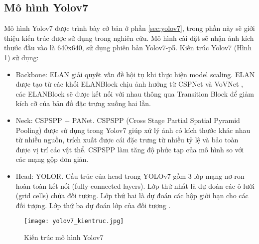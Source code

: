 \documentclass[../the.tex]{subfiles}
\begin{document}
\subsection{Mô hình Yolov7}
{\fontsize{13}{12} \selectfont  
Mô hình Yolov7 được trình bày cở bản ở phần \ref{sec:yolov7}, trong phần này sẽ giới thiệu kiến trúc được sử dụng trong nghiên cứu. Mô hình cài đặt sẽ nhận ảnh kích thước đầu vào là 640x640, sử dụng phiên bản Yolov7-p5. Kiến trúc Yolov7 (Hình \ref{fig:yolov7_kientruc}) sử dụng:
\begin{itemize}
	\item Backbone: ELAN giải quyết vấn đề hội tụ khi thực hiện model scaling. ELAN được tạo từ các khối ELANBlock chịu ảnh hưởng từ CSPNet \cite{wang2019cspnet} và VoVNet \cite{lee2019energy}, các ELANBlock sẽ được kết nối với nhau thông qua Transition Block để giảm kích cỡ của bản đồ đặc trưng xuống hai lần.
	\item Neck: CSPSPP + PANet. CSPSPP (Cross Stage Partial Spatial Pyramid Pooling) được sử dụng trong Yolov7 giúp xử lý ảnh có kích thước khác nhau từ nhiều nguồn, trích xuất được cái đặc trưng từ nhiều tỷ lệ và bảo toàn được vị trí các vật thể. CSPSPP làm tăng độ phức tạp của mô hình so với các mạng gộp đơn giản.
	\item Head: YOLOR. Cấu trúc của head trong YOLOv7
	gồm 3 lớp mạng nơ-ron hoàn toàn kết nối
	(fully-connected layers). Lớp thứ nhất
	là dự đoán các ô lưới (grid cells) chứa đối
	tượng. Lớp thứ hai là dự đoán các hộp giới hạn cho các đối tượng. Lớp thứ ba dự đoán lớp của đối tượng \cite{cachuayol7}.
\end{itemize}
}

\begin{figure}[H]
	\centering
	\texttt{[image: yolov7\_kientruc.jpg]}
	\caption{Kiến trúc mô hình Yolov7}
	\label{fig:yolov7_kientruc}
\end{figure}
\end{document}
